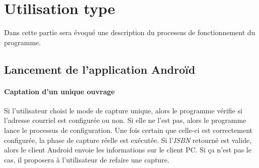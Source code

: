 \section{Utilisation type}
Dans cette partie sera évoqué une description du processus de fonctionnement du programme.

\subsection{Lancement de l'application Androïd}

\paragraph{Captation d'un unique ouvrage} 


Si l'utilisateur choisi le mode de capture unique, alors le programme vérifie si l'adresse courriel est configurée ou non. 
Si elle ne l'est pas, alors le programme lance le processus de configuration. 
Une fois certain que celle-ci est correctement configurée, la phase de capture réelle est exécutée. 
Si l'\emph{ISBN} retourné est valide, alors le client Android envoie les informations sur le client PC. 
Si ça n'est pas le cas, il proposera à l'utilisateur de refaire une capture. 


\begin{figure}[htbp]
  \begin{center}
    \leavevmode
    \hspace{4cm}
  \end{center}
\end{figure}

